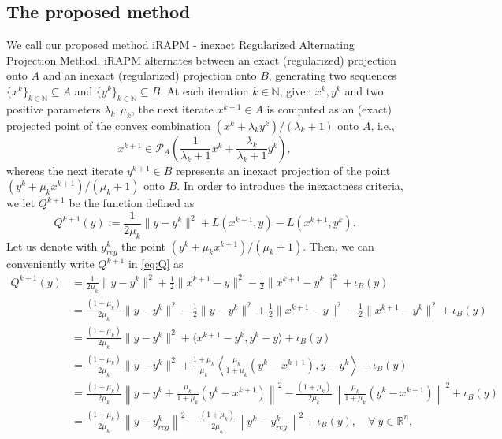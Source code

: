 \documentclass[pdflatex,sn-mathphys-num]{sn-jnl}
\numberwithin{equation}{section}%
\def\R{\mathbb{R}}
\def\N{\mathbb{N}}
\newcommand{\yck}{{y_{reg}^k}}
\newcommand{\proj}{\mathcal{P}}
\theoremstyle{thmstyleone}%
\theoremstyle{thmstyletwo}%
\theoremstyle{thmstylethree}%
\begin{document}
\subsection{The proposed method}
We call our proposed method iRAPM - inexact Regularized Alternating Projection Method. iRAPM alternates between an exact (regularized) projection onto $A$ and an inexact (regularized) projection onto $B$, generating two sequences $\{x^k\}_{k\in\N}\subseteq A$ and $\{y^k\}_{k\in\N}\subseteq B$. At each iteration $k\in\N$, given $x^k,y^k$ and two positive parameters $\lambda_k,\mu_k$, the next iterate $x^{k+1}\in A$ is computed as an (exact) projected point of the convex combination $(x^k+\lambda_k y^k)/(\lambda_k+1)$ onto $A$, i.e.,
\begin{equation*}
    x^{k+1} \in \proj_A\left(\frac{1}{\lambda_k+1}x^k+\frac{\lambda_k}{\lambda_k+1}y^k\right),
\end{equation*}
whereas the next iterate $y^{k+1}\in B$ represents an inexact projection of the point $(y^k+\mu_k x^{k+1})/(\mu_k+1)$ onto $B$. In order to introduce the inexactness criteria, we let $Q^{k+1}$ be the function defined as
\begin{equation}
Q^{k+1}(y):= \frac{1}{2\mu_k}\|y-y^k\|^2+L(x^{k+1},y)-L(x^{k+1},y^k).\label{eq:Q}
\end{equation}
{Let us denote with $\yck$ the point $(y^k+\mu_k x^{k+1})/(\mu_k+1)$. Then, we can conveniently write $Q^{k+1}$ in \eqref{eq:Q} as}
\begin{align}\label{eq:Qbis}
    Q^{k+1}(y)&= 
    \frac{1}{2\mu_k}\|y-y^k\|^2+\frac{1}{2}\|x^{k+1}-y\|^2-\frac{1}{2}\|x^{k+1}-y^k\|^2+\iota_B(y) \nonumber  \\
    &=\frac{(1+\mu_k)}{2\mu_k}\|y-y^k\|^2-\frac{1}{2}\|y-y^k\|^2+\frac{1}{2}\|x^{k+1}-y\|^2-\frac{1}{2}\|x^{k+1}-y^k\|^2+\iota_B(y)\nonumber\\
    &=\frac{(1+\mu_k)}{2\mu_k}\|y-y^k\|^2+\langle x^{k+1}-y^k,y^k-y\rangle+\iota_{B}(y)\nonumber\\
    &=\frac{(1+\mu_k)}{2\mu_k}\|y-y^k\|^2+\frac{1+\mu_k}{\mu_k}\left\langle \frac{\mu_k}{1+\mu_k}(y^k-x^{k+1}),y-y^k\right\rangle+\iota_{B}(y)\nonumber\\
    &=\frac{(1+\mu_k)}{2\mu_k}\left\|y-y^k+\frac{\mu_k}{1+\mu_k}\left(y^k-x^{k+1}\right)\right\|^2-\frac{(1+\mu_k)}{2\mu_k}\left\|\frac{\mu_k}{1+\mu_k} (y^k - x^{k+1})\right\|^2+\iota_B(y)\nonumber\\
    &=\frac{(1+\mu_k)}{2\mu_k}\left\|y-\yck\right\|^2-\frac{(1+\mu_k)}{2\mu_k}\left\|y^k-\yck\right\|^2+\iota_B(y), \quad \forall \ y\in \R^n,
\end{align}
\end{document}
